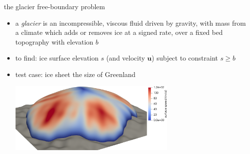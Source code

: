 \documentclass[svgnames,
               hyperref={colorlinks,citecolor=DeepPink4,linkcolor=FireBrick,urlcolor=Maroon},
               usepdftitle=false]  %
               {beamer}
\newcommand{\bu}{\mathbf{u}}
\begin{document}
\begin{frame}{``where are the glaciers?'' is a free-boundary problem}
alps-seguinot2018.png}

\vspace{-2mm}
\hfill {\tiny \emph{Seguinot et al.~(2018)}}
\end{frame}


\begin{frame}{the glacier free-boundary problem}

\begin{itemize}
\item a \emph{glacier} is an incompressible, viscous fluid driven by gravity, with mass from a climate which adds or removes ice at a signed rate, over a fixed bed topography with elevation $b$
\item to find: ice surface elevation $s$ (and velocity $\bu$) subject to constraint $\boxed{s\ge b}$
\item test case: ice sheet the size of Greenland

\bigskip
\begin{center}
\includegraphics[width=0.65\textwidth]{../paper/fixfigs/sialev8scene.png}
\end{center}
\end{itemize}
\end{frame}
\end{document}
